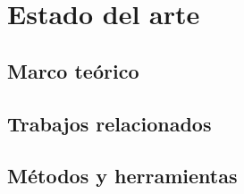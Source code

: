 \chapter{Estado del arte}
\label{chap:estado_arte}

\section{Marco teórico}


\section{Trabajos relacionados}


\section{Métodos y herramientas}

